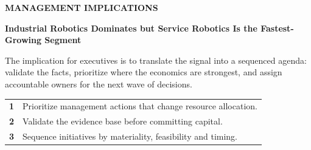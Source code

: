 \documentclass[10pt,a4paper]{article}
\begin{document}
\clearpage
{\textcolor{BOBlue}{\scriptsize\bfseries MANAGEMENT IMPLICATIONS}}\par\vspace{-1pt}
{\Large\sffamily\bfseries\color{BONavy} Industrial Robotics Dominates but Service Robotics Is the Fastest-Growing Segment}\par\vspace{4pt}
{\small The implication for executives is to translate the signal into a sequenced agenda: validate the facts, prioritize where the economics are strongest, and assign accountable owners for the next wave of decisions.}\par
\begin{tabularx}{\linewidth}{p{10mm}Y}
\textcolor{BOBlue}{\bfseries 1} & Prioritize management actions that change resource allocation. \\[5pt]
\textcolor{BOBlue}{\bfseries 2} & Validate the evidence base before committing capital. \\[5pt]
\textcolor{BOBlue}{\bfseries 3} & Sequence initiatives by materiality, feasibility and timing. \\[5pt]
\end{tabularx}
\vspace{6pt}

\vspace{6pt}{\textcolor{BOBlue}{\scriptsize\bfseries EXECUTION ROADMAP}}\par
\begin{center}
\end{center}
\end{document}
